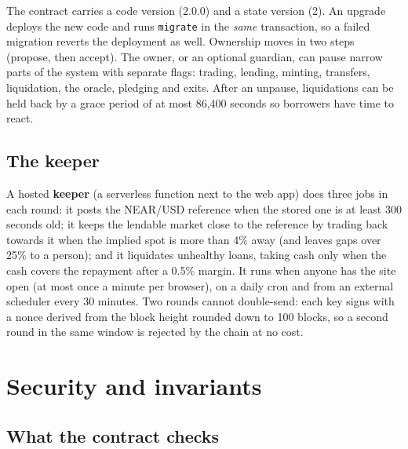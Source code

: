 \documentclass[11pt,a4paper]{article}
\newcommand{\code}[1]{\texttt{\small #1}}
\begin{document}
The contract carries a code version (2.0.0) and a state version (2). An upgrade deploys the new code and runs
\code{migrate} in the \emph{same} transaction, so a failed migration reverts the deployment as well. Ownership moves
in two steps (propose, then accept). The owner, or an optional guardian, can pause narrow parts of the system with
separate flags: trading, lending, minting, transfers, liquidation, the oracle, pledging and exits. After an unpause,
liquidations can be held back by a grace period of at most 86,400 seconds so borrowers have time to react.

\subsection{The keeper}

A hosted \textbf{keeper} (a serverless function next to the web app) does three jobs in each round: it posts the
NEAR/USD reference when the stored one is at least 300 seconds old; it keeps the lendable market close to the
reference by trading back towards it when the implied spot is more than 4\% away (and leaves gaps over 25\% to a
person); and it liquidates unhealthy loans, taking cash only when the cash covers the repayment after a 0.5\% margin.
It runs when anyone has the site open (at most once a minute per browser), on a daily cron and from an external
scheduler every 30 minutes. Two rounds cannot double-send: each key signs with a nonce derived from the block height
rounded down to 100 blocks, so a second round in the same window is rejected by the chain at no cost.

\section{Security and invariants}
\label{sec:security}

\subsection{What the contract checks}
\end{document}
